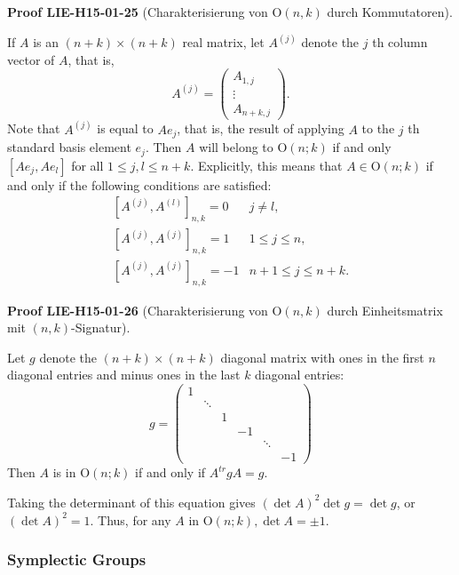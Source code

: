 \documentclass[10pt, letterpaper]{article}
\newcommand{\Ogroup}{\mathrm{O}} %
\newcommand{\CustomHeading}[3]{%
  \par\medskip\noindent%
  \textbf{#1 #2} \textnormal{(#3)}.\enskip%
}
\newenvironment{PROOF}[2]{\begin{unitbox}\CustomHeading{Proof}{#1}{#2}}{\end{unitbox}}
\begin{document}
\begin{PROOF}{LIE-H15-01-25}{Charakterisierung von $\Ogroup(n,k)$ durch Kommutatoren}
If $A$ is an $(n+k) \times(n+k)$ real matrix, let $A^{(j)}$ denote the $j$ th column vector of $A$, that is,
$$
A^{(j)}=\left(\begin{array}{c}
A_{1, j} \\
\vdots \\
A_{n+k, j}
\end{array}\right) .
$$
Note that $A^{(j)}$ is equal to $A e_{j}$, that is, the result of applying $A$ to the $j$ th standard basis element $e_{j}$. Then $A$ will belong to $\mathrm{O}(n ; k)$ if and only $\left[A e_{j}, A e_{l}\right]$ for all $1 \leq j, l \leq n+k$. Explicitly, this means that $A \in \mathrm{O}(n ; k)$ if and only if the following conditions are satisfied:
$$
\begin{array}{ll}
{\left[A^{(j)}, A^{(l)}\right]_{n, k}=0} & j \neq l, \\
{\left[A^{(j)}, A^{(j)}\right]_{n, k}=1} & 1 \leq j \leq n, \\
{\left[A^{(j)}, A^{(j)}\right]_{n, k}=-1} & n+1 \leq j \leq n+k .
\end{array}
$$
\end{PROOF}


\begin{PROOF}{LIE-H15-01-26}{Charakterisierung von $\Ogroup(n,k)$ durch Einheitsmatrix mit $(n,k)$-Signatur}
Let $g$ denote the $(n+k) \times(n+k)$ diagonal matrix with ones in the first $n$ diagonal entries and minus ones in the last $k$ diagonal entries:
$$
g=\left(\begin{array}{llllll}
1 & & & & & \\
& \ddots & & & & \\
& & 1 & & & \\
& & & -1 & & \\
& & & & \ddots & \\
& & & & & -1
\end{array}\right)
$$
Then $A$ is in $\mathrm{O}(n ; k)$ if and only if $A^{t r} g A=g$. 

Taking the determinant of this equation gives $(\operatorname{det} A)^{2} \operatorname{det} g=\operatorname{det} g$, or $(\operatorname{det} A)^{2}=1$. Thus, for any $A$ in $\mathrm{O}(n ; k), \operatorname{det} A= \pm 1$.
\end{PROOF}



\subsubsection*{Symplectic Groups}
\end{document}
